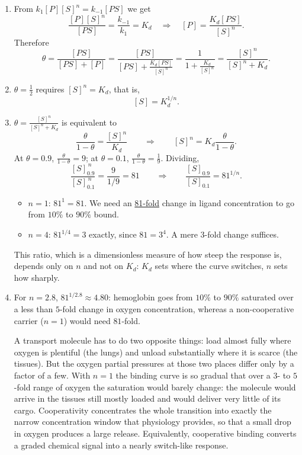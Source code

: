 \documentclass[a4paper,12pt]{article}
\begin{document}
\begin{enumerate}[label=(\alph*)]
\item From $k_1[P][S]^n = k_{-1}[PS]$ we get
\[ \frac{[P][S]^n}{[PS]} = \frac{k_{-1}}{k_1} = K_d
\quad\Longrightarrow\quad
[P] = \frac{K_d [PS]}{[S]^n} . \]
Therefore
\[
\theta = \frac{[PS]}{[PS]+[P]}
= \frac{[PS]}{[PS] + \frac{K_d[PS]}{[S]^n}}
= \frac{1}{1+\frac{K_d}{[S]^n}}
= \frac{[S]^n}{[S]^n+K_d} .
\]

\item $\theta=\frac{1}{2}$ requires $[S]^n = K_d$, that is,
\[ [S] = K_d^{1/n} . \]

\item $\theta = \frac{[S]^n}{[S]^n+K_d}$ is equivalent to
\[ \frac{\theta}{1-\theta} = \frac{[S]^n}{K_d}
\qquad\Longrightarrow\qquad
[S]^n = K_d \frac{\theta}{1-\theta} . \]
At $\theta=0.9$, $\frac{\theta}{1-\theta}=9$; at $\theta=0.1$, $\frac{\theta}{1-\theta}=\frac{1}{9}$. Dividing,
\[ \frac{[S]_{0.9}^{\,n}}{[S]_{0.1}^{\,n}} = \frac{9}{1/9} = 81
\qquad\Longrightarrow\qquad
\frac{[S]_{0.9}}{[S]_{0.1}} = 81^{1/n} . \]
\begin{itemize}
\item $n=1$: $81^{1} = \boxed{81}$. We need an \underline{81-fold} change in ligand concentration to go from $10\%$ to $90\%$ bound.
\item $n=4$: $81^{1/4} = \boxed{3}$ exactly, since $81=3^4$. A mere $3$-fold change suffices.
\end{itemize}
This ratio, which is a dimensionless measure of how steep the response is, depends only on $n$ and not on $K_d$: $K_d$ sets where the curve switches, $n$ sets how sharply.

\item For $n=2.8$, $81^{1/2.8} \approx 4.80$: hemoglobin goes from $10\%$ to $90\%$ saturated over a less than $5$-fold change in oxygen concentration, whereas a non-cooperative carrier ($n=1$) would need $81$-fold.

A transport molecule has to do two opposite things: load almost fully where oxygen is plentiful (the lungs) and unload substantially where it is scarce (the tissues). But the oxygen partial pressures at those two places differ only by a factor of a few. With $n=1$ the binding curve is so gradual that over a $3$- to $5$-fold range of oxygen the saturation would barely change: the molecule would arrive in the tissues still mostly loaded and would deliver very little of its cargo. Cooperativity concentrates the whole transition into exactly the narrow concentration window that physiology provides, so that a small drop in oxygen produces a large release. Equivalently, cooperative binding converts a graded chemical signal into a nearly switch-like response.

\end{enumerate}
\end{document}
